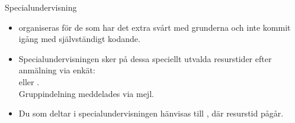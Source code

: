 \begin{SlideExtra}{Specialundervisning}
\begin{itemize}
\item  {} organiseras för de som har det extra svårt med grunderna och inte kommit igång med självständigt kodande.
\item Specialundervisningen sker på dessa speciellt utvalda resurstider efter anmälning via enkät: \\  eller . \\ Gruppindelning meddelades via mejl.  
\item Du som  deltar i specialundervisningen hänvisas till , där  resurstid pågår. 
\end{itemize}
\end{SlideExtra}
\fi

